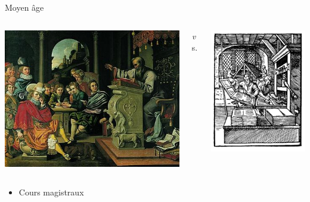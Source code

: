 \begin{frame}{Moyen âge}
\begin{columns}
	\begin{column}{0.40\linewidth}
		\centering
		\includegraphics[height=0.35\paperheight]{../resources/illustrations/lecture} \\
	\end{column}
	\begin{column}{0.09\linewidth} \centering \huge \emph vs. \end{column}
	\begin{column}{0.40\linewidth}
		\centering
		\includegraphics[height=0.35\paperheight]{../resources/illustrations/gutenberg} \\
	\end{column}
\end{columns}
\begin{columns}
	\begin{column}{0.49\linewidth}
		\begin{itemize}
			\item Cours magistraux

\end{itemize}
\end{column}
\end{columns}
\end{frame}
